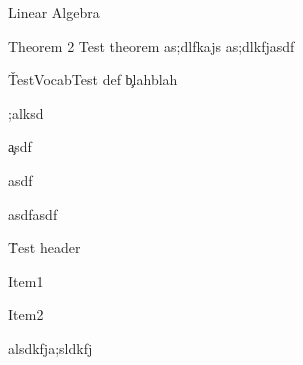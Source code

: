 \documentclass[10pt]{article}
\begin{document}
Linear Algebra


\begin{theorem}{Theorem 2}
Test theorem
as;dlfkajs
as;dlkfjasdf
\end{theorem}
\v{TestVocab}{Test def}
\c blahblah \;

\eg ;alksd \;


\c asdf \;

asdf

asdfasdf

\={Test header}


\begin{c-}
\item Item1
\item Item2
\end{c-}
alsdkfja;sldkfj
\end{document}
